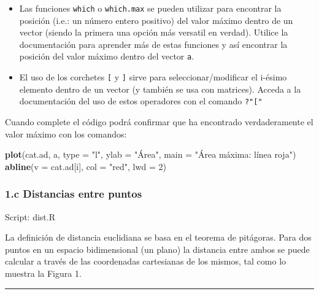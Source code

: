 \documentclass[]{article}
\newenvironment{Shaded}{}{}
\newcommand{\KeywordTok}[1]{\textcolor[rgb]{0.00,0.44,0.13}{\textbf{{#1}}}}
\newcommand{\DataTypeTok}[1]{\textcolor[rgb]{0.56,0.13,0.00}{{#1}}}
\newcommand{\DecValTok}[1]{\textcolor[rgb]{0.25,0.63,0.44}{{#1}}}
\newcommand{\StringTok}[1]{\textcolor[rgb]{0.25,0.44,0.63}{{#1}}}
\newcommand{\NormalTok}[1]{{#1}}
\begin{document}
\begin{itemize}
\item
  Las funciones \texttt{which} o \texttt{which.max} se pueden utilizar
  para encontrar la posición (i.e.: un número entero positivo) del valor
  máximo dentro de un vector (siendo la primera una opción más versatil
  en verdad). Utilice la documentación para aprender más de estas
  funciones y así encontrar la posición del valor máximo dentro del
  vector \texttt{a}.
\item
  El uso de los corchetes \texttt{{[}} y \texttt{{]}} sirve para
  seleccionar/modificar el i-ésimo elemento dentro de un vector (y
  también se usa con matrices). Acceda a la documentación del uso de
  estos operadores con el comando \texttt{?"{[}"}
\end{itemize}
Cuando complete el código podrá confirmar que ha encontrado
verdaderamente el valor máximo con los comandos:

\begin{Shaded}
\begin{Highlighting}[]
\KeywordTok{plot}\NormalTok{(cat.ad, a, }\DataTypeTok{type =} \StringTok{"l"}\NormalTok{, }\DataTypeTok{ylab =} \StringTok{"Área"}\NormalTok{, }\DataTypeTok{main =} \StringTok{"Área máxima: línea roja"}\NormalTok{)}
\KeywordTok{abline}\NormalTok{(}\DataTypeTok{v =} \NormalTok{cat.ad[i], }\DataTypeTok{col =} \StringTok{"red"}\NormalTok{, }\DataTypeTok{lwd =} \DecValTok{2}\NormalTok{)}
\end{Highlighting}
\end{Shaded}
\subsubsection{1.c Distancias entre puntos}

Script: dist.R

La definición de distancia euclidiana se basa en el teorema de
pitágoras. Para dos puntos en un espacio bidimensional (un plano) la
distancia entre ambos se puede calcular a través de las coordenadas
cartesianas de los mismos, tal como lo muestra la Figura 1.

\begin{center}\rule{3in}{0.4pt}\end{center}
\end{document}
